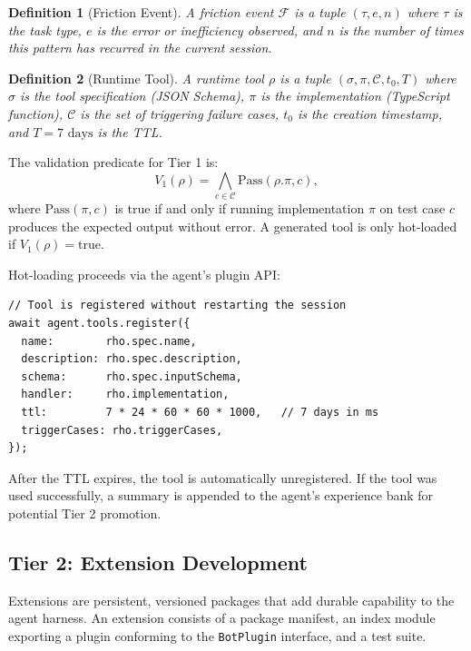 \documentclass[11pt]{article}
\newtheorem{definition}{Definition}
\begin{document}
\begin{definition}[Friction Event]
A \emph{friction event} $\mathcal{F}$ is a tuple $(\tau, e, n)$ where $\tau$ is
the task type, $e$ is the error or inefficiency observed, and $n$ is the number
of times this pattern has recurred in the current session.
\end{definition}

\begin{definition}[Runtime Tool]
A \emph{runtime tool} $\rho$ is a tuple $(\sigma, \pi, \mathcal{C}, t_0, T)$
where $\sigma$ is the tool specification (JSON Schema), $\pi$ is the
implementation (TypeScript function), $\mathcal{C}$ is the set of triggering
failure cases, $t_0$ is the creation timestamp, and $T = 7\text{ days}$ is the
TTL.
\end{definition}

The validation predicate for Tier 1 is:
\begin{equation}
    V_1(\rho) = \bigwedge_{c \in \mathcal{C}} \text{Pass}(\rho.\pi, c),
\end{equation}
where $\text{Pass}(\pi, c)$ is true if and only if running implementation $\pi$
on test case $c$ produces the expected output without error. A generated tool
is only hot-loaded if $V_1(\rho) = \text{true}$.

Hot-loading proceeds via the agent's plugin API:
\begin{verbatim}
// Tool is registered without restarting the session
await agent.tools.register({
  name:        rho.spec.name,
  description: rho.spec.description,
  schema:      rho.spec.inputSchema,
  handler:     rho.implementation,
  ttl:         7 * 24 * 60 * 60 * 1000,   // 7 days in ms
  triggerCases: rho.triggerCases,
});
\end{verbatim}

After the TTL expires, the tool is automatically unregistered. If the tool was
used successfully, a summary is appended to the agent's experience bank for
potential Tier 2 promotion.

\subsection{Tier 2: Extension Development}
\label{sec:tier2}

Extensions are persistent, versioned packages that add durable capability to the
agent harness. An extension consists of a package manifest, an index module
exporting a plugin conforming to the \texttt{BotPlugin} interface, and a test
suite.
\end{document}
